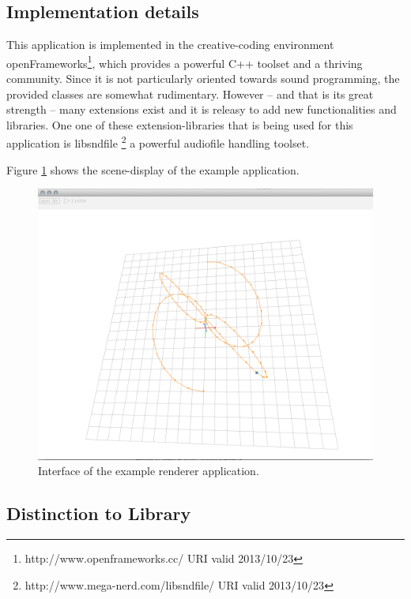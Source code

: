 \documentclass[a4paper]{article}
\begin{document}
\subsection{Implementation details}

This application is implemented in the creative-coding environment openFrameworks\footnote{http://www.openframeworks.cc/ URI valid 2013/10/23}, which provides a powerful C++ toolset and a thriving community.
Since it is not particularly oriented towards sound programming, the provided classes are somewhat rudimentary.
However -- and that is its great strength -- many extensions exist and it is releasy to add new functionalities and libraries.
One one of these extension-libraries that is being used for this application is libsndfile  
\footnote{http://www.mega-nerd.com/libsndfile/ URI valid 2013/10/23} a powerful audiofile handling toolset.
 
Figure \ref{fig:screenshot} shows the scene-display of the example application. 

\begin{figure}[h]
\centerline{
	\includegraphics[width=\columnwidth]{SpatDIFrenderer_screenshot2}}
\caption{Interface of the example renderer application.}
\label{fig:screenshot}
\end{figure}

 



\subsection{Distinction to Library}
\end{document}
